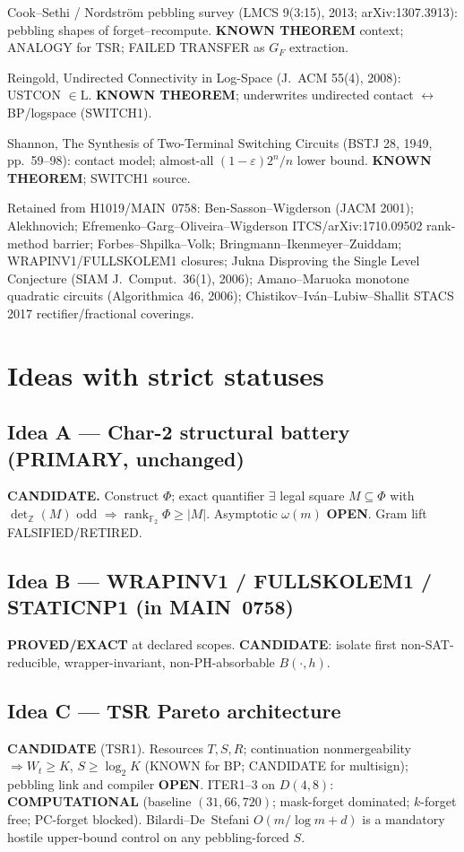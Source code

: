 \documentclass[11pt]{article}
\begin{document}
Cook--Sethi / Nordstr\"om pebbling survey (LMCS 9(3:15), 2013; arXiv:1307.3913):
pebbling shapes of forget--recompute. \textbf{KNOWN THEOREM} context; ANALOGY for TSR;
FAILED TRANSFER as $G_F$ extraction.

Reingold, Undirected Connectivity in Log-Space (J.\ ACM 55(4), 2008): USTCON $\in\mathrm{L}$.
\textbf{KNOWN THEOREM}; underwrites undirected contact $\leftrightarrow$ BP/logspace (SWITCH1).

Shannon, The Synthesis of Two-Terminal Switching Circuits (BSTJ 28, 1949, pp.~59--98):
contact model; almost-all $(1-\varepsilon)2^n/n$ lower bound. \textbf{KNOWN THEOREM}; SWITCH1 source.

Retained from H1019/MAIN~0758: Ben-Sasson--Wigderson (JACM 2001); Alekhnovich;
Efremenko--Garg--Oliveira--Wigderson ITCS/arXiv:1710.09502 rank-method barrier;
Forbes--Shpilka--Volk; Bringmann--Ikenmeyer--Zuiddam; WRAPINV1/FULLSKOLEM1 closures;
Jukna Disproving the Single Level Conjecture (SIAM J.\ Comput.\ 36(1), 2006);
Amano--Maruoka monotone quadratic circuits (Algorithmica 46, 2006);
Chistikov--Iv\'an--Lubiw--Shallit STACS 2017 rectifier/fractional coverings.

\section*{Ideas with strict statuses}
\subsection*{Idea A --- Char-2 structural battery (PRIMARY, unchanged)}
\textbf{CANDIDATE.} Construct $\Phi$; exact quantifier
$\exists$ legal square $M\subseteq\Phi$ with $\det_{\mathbb Z}(M)$ odd
$\Rightarrow\operatorname{rank}_{\mathbb F_2}\Phi\ge|M|$. Asymptotic $\omega(m)$ \textbf{OPEN}.
Gram lift FALSIFIED/RETIRED.

\subsection*{Idea B --- WRAPINV1 / FULLSKOLEM1 / STATICNP1 (in MAIN~0758)}
\textbf{PROVED/EXACT} at declared scopes.
\textbf{CANDIDATE}: isolate first non-SAT-reducible, wrapper-invariant, non-PH-absorbable $B(\cdot,h)$.

\subsection*{Idea C --- TSR Pareto architecture}
\textbf{CANDIDATE} (TSR1). Resources $T,S,R$; continuation nonmergeability $\Rightarrow W_t\ge K$,
$S\ge\log_2 K$ (KNOWN for BP; CANDIDATE for multisign); pebbling link and compiler \textbf{OPEN}.
ITER1--3 on $D(4,8)$: \textbf{COMPUTATIONAL} (baseline $(31,66,720)$; mask-forget dominated;
$k$-forget free; PC-forget blocked). Bilardi--De~Stefani $O(m/\log m+d)$ is a mandatory
hostile upper-bound control on any pebbling-forced $S$.
\end{document}
